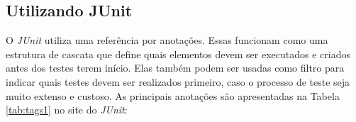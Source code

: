 




 








\subsection{Utilizando JUnit}

O \textit{JUnit} utiliza uma referência por anotações. Essas funcionam como uma estrutura de cascata que define quais elementos devem ser executados e criados antes dos testes terem início. Elas também podem ser usadas como filtro para indicar quais testes devem ser realizados primeiro, caso o processo de teste seja muito extenso e custoso. 
As principais anotações são apresentadas na Tabela \ref{tab:tags1} no site do \textit{JUnit}:


